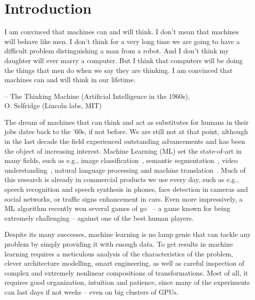 \chapter{Introduction}


{
    \setlength\epigraphwidth{10cm}
    \setlength\epigraphrule{0pt}
    \renewcommand{\epigraphflush}{center}
    \epigraph{
        I am convinced that machines can and will think. I don't mean that
        machines will behave like men. I don't think for a very long time we
        are going to have a difficult problem distinguishing a man from a
        robot. And I don't think my daughter will ever marry a computer. But I
        think that computers will be doing the things that men do when we say
        they are thinking. I am convinced that machines can and will think in
        our lifetime.}{-- \textup{The Thinking Machine (Artificial Intelligence
            in the 1960s)}, \\ O. Selfridge (Lincoln labs, MIT)}
}

The dream of machines that can think and act as substitutes for humans in their
jobs dates back to the '60s, if not before. We are still not at that point,
although in the last decade the field experienced outstanding advancements and
has been the object of increasing interest. Machine Learning (ML) set the
state-of-art in many fields, such as e.g., image classification~\cite{
Krizhevsky-2012,szegedy2016inception,visin2015renet}, semantic
segmentation~\cite{chen2015semantic, Visin_2016_CVPR_Workshops}, video
understanding~\citep{srivastava2015unsupervised, Xu-et-al-arxiv2015}, natural
language processing and machine translation~\citep{Bahdanau-et-al-arxiv2014}.
Much of this research is already in commercial products we use every day, such
as e.g., speech recognition and speech synthesis in phones, face detection in
cameras and social networks, or traffic signs enhancement in cars. Even more
impressively, a ML algorithm recently won several games of go~\citep{
silver2016alphago} -- a game known for being extremely challenging -- against
one of the best human players.

Despite its many successes, machine learning is no lamp genie that can tackle
any problem by simply providing it with enough data. To get results in machine
learning requires a meticulous analysis of the characteristics of the problem,
clever architecture modelling, smart engineering, as well as careful inspection
of complex and extremely nonlinear compositions of transformations.  Most of
all, it requires good organization, intuition and patience, since many of the
experiments can last days if not weeks -- even on big clusters of GPUs.

